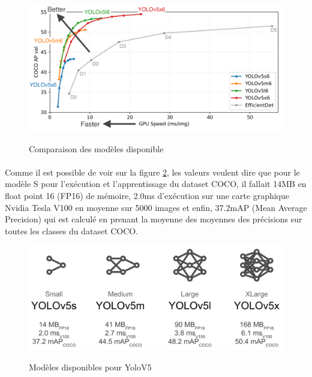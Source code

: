             \begin{figure}[H]
                \centering
            	\begin{frame}{\includegraphics[width=1\textwidth]{image/modeleSpeedYolo.png}}
            	\end{frame}
            	\caption{\label{fig:compModeleYolo}Comparaison des modèles disponible}
            \end{figure}
            
            \paragraph*{}
            Comme il est possible de voir sur la figure \ref{fig:modeleYolo}, les valeurs veulent dire que pour le modèle S pour l'exécution et l'apprentissage du dataset COCO, il fallait 14MB en float point 16 (FP16) de mémoire, 2.0ms d'exécution sur une carte graphique Nvidia Tesla V100 en moyenne sur 5000 images et enfin, 37.2mAP (Mean Average Precision) qui est calculé en prenant la moyenne des moyennes des précisions sur toutes les classes du dataset COCO.
            
            \begin{figure}[H]
                \centering
            	\begin{frame}{\includegraphics[width=1\textwidth]{image/yolov5.png}}
            	\end{frame}
            	\caption{\label{fig:modeleYolo}Modèles disponibles pour YoloV5}
            \end{figure}
            
